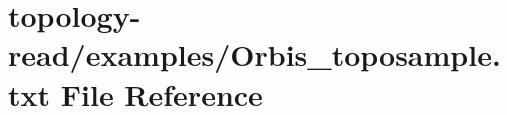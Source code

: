 \hypertarget{Orbis__toposample_8txt}{}\section{topology-\/read/examples/\+Orbis\+\_\+toposample.txt File Reference}
\label{Orbis__toposample_8txt}
